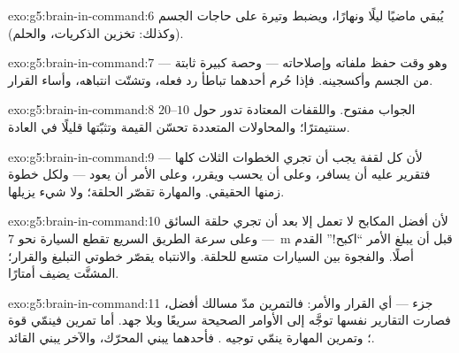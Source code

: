 \begin{solution}{exo:g5:brain-in-command:6}
يُبقي  ماضيًا ليلًا ونهارًا، ويضبط وتيرة  على حاجات
الجسم (وكذلك: تخزين الذكريات، والحلم).
\end{solution}

\begin{solution}{exo:g5:brain-in-command:7}
 --- وهو وقت حفظ ملفاته وإصلاحاته --- وحصة كبيرة ثابتة من
 الجسم وأكسجينه. فإذا حُرم أحدهما تباطأ رد فعله، وتشتّت
انتباهه، وأساء القرار.
\end{solution}

\begin{solution}{exo:g5:brain-in-command:8}
الجواب مفتوح. واللقفات المعتادة تدور حول $10$--$20$ سنتيمترًا؛
والمحاولات المتعددة تحسّن القيمة وتثبّتها قليلًا في العادة.
\end{solution}

\begin{solution}{exo:g5:brain-in-command:9}
لأن كل لقفة يجب أن تجري الخطوات الثلاث كلها --- فتقرير 
عليه أن يسافر، وعلى  أن يحسب ويقرر، وعلى الأمر أن يعود
  --- ولكل خطوة زمنها الحقيقي. والمهارة تقصّر الحلقة؛
ولا شيء يزيلها.
\end{solution}

\begin{solution}{exo:g5:brain-in-command:10}
لأن أفضل المكابح لا تعمل إلا بعد أن تجري حلقة السائق --- وعلى سرعة
الطريق السريع تقطع السيارة نحو \qty{7}{m} قبل أن يبلغ الأمر
``اكبح!'' القدم أصلًا. والفجوة بين السيارات متسع للحلقة. والانتباه
يقصّر خطوتي التبليغ والقرار؛  المشتَّت يضيف أمتارًا.
\end{solution}

\begin{solution}{exo:g5:brain-in-command:11}
جزء  --- أي القرار والأمر: فالتمرين مدّ مسالك أفضل، فصارت
التقارير نفسها توجَّه إلى الأوامر الصحيحة سريعًا وبلا جهد. أما
تمرين  فينمّي قوة ؛ وتمرين المهارة ينمّي توجيه .
فأحدهما يبني المحرّك، والآخر يبني القائد.
\end{solution}
